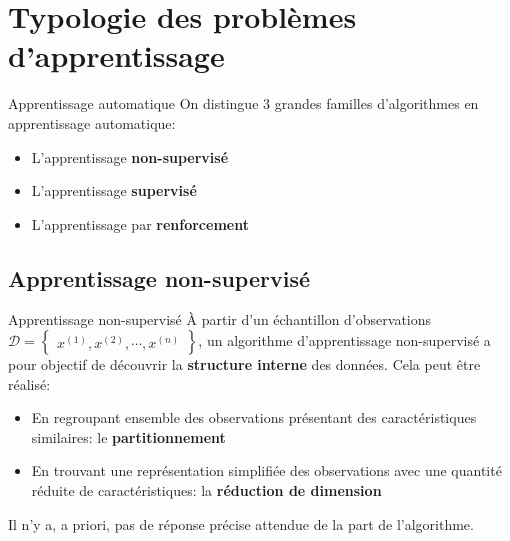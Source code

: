 \section[Typologie]{Typologie des problèmes d'apprentissage}

\begin{frame}{Apprentissage automatique}
	On distingue 3 grandes familles d'algorithmes en apprentissage automatique:
	\begin{itemize}
		\item L'apprentissage \textbf{non-supervisé}
		\item L'apprentissage \textbf{supervisé}
		\item L'apprentissage par \textbf{renforcement}
	\end{itemize}
\end{frame}

\subsection[Apprentissage non-supervisé]{Apprentissage non-supervisé}

\begin{frame}{Apprentissage non-supervisé}
	\`A partir d'un échantillon d'observations $\mathcal{D} = \begin{Bmatrix}x^{(1)}, x^{(2)}, \cdots, x^{(n)}\end{Bmatrix}$, un algorithme d'apprentissage non-supervisé a pour objectif de découvrir la \textbf{structure interne} des données. Cela peut être réalisé:
	
	\begin{itemize}
		\item En regroupant ensemble des observations présentant des caractéristiques similaires: le \textbf{partitionnement}
		\item En trouvant une représentation simplifiée des observations avec une quantité réduite de caractéristiques: la \textbf{réduction de dimension}
	\end{itemize}
	\vspace{0.5cm}
	Il n'y a, a priori, pas de réponse précise attendue de la part de l'algorithme.
	
\end{frame}

